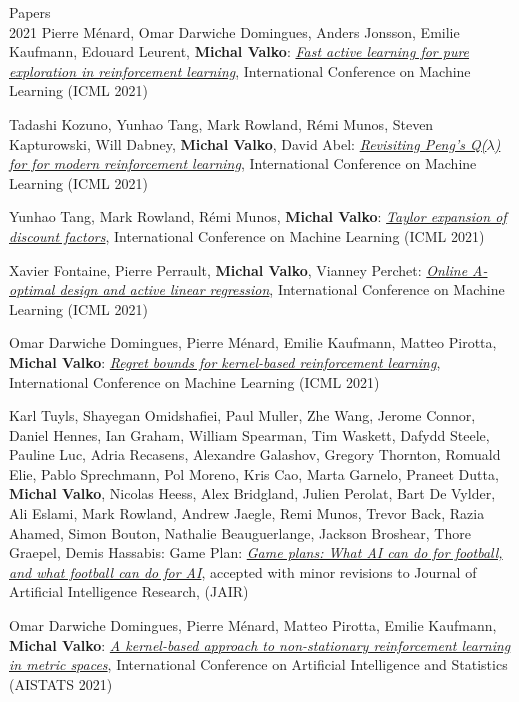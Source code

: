 \documentclass{resume}
\begin{document}
\begin{category}{Papers\\2021}
\citembullet
Pierre M\' enard,  Omar Darwiche Domingues, Anders Jonsson,  Emilie Kaufmann, Edouard Leurent, {\bf Michal Valko}:
\href{http://arxiv.org/abs/2007.13442.pdf}{\emph{Fast active learning for pure exploration in reinforcement learning}},
International Conference on Machine Learning
({\sf ICML 2021}) 


\citembullet
Tadashi Kozuno, Yunhao Tang, Mark Rowland, R\' emi Munos, Steven Kapturowski, Will Dabney, {\bf Michal Valko}, David Abel: 
\href{https://arxiv.org/pdf/2103.00107.pdf}{\emph{Revisiting Peng's Q($\lambda$) for for modern reinforcement learning}},
International Conference on Machine Learning
({\sf ICML 2021}) 

\citembullet
Yunhao Tang, Mark Rowland, R\' emi Munos, {\bf Michal Valko}: 
\href{https://arxiv.org/pdf/2106.06170.pdf}{\emph{Taylor expansion of discount factors}},
International Conference on Machine Learning
({\sf ICML 2021}) 

\citembullet
Xavier Fontaine, Pierre Perrault, {\bf Michal Valko}, Vianney Perchet:
\href{https://arxiv.org/pdf/1906.08509.pdf}{\emph{Online A-optimal design and active linear regression}},
International Conference on Machine Learning
({\sf ICML 2021}) 


\citembullet
Omar Darwiche Domingues, Pierre M\'enard, Emilie Kaufmann, Matteo Pirotta, {\bf Michal Valko}:
\href{https://arxiv.org/abs/2004.05599}{\emph{Regret bounds for kernel-based reinforcement learning}},
International Conference on Machine Learning
({\sf ICML 2021}) 


\citembullet
Karl Tuyls, Shayegan Omidshafiei, Paul Muller, Zhe Wang, Jerome Connor, Daniel Hennes, Ian Graham, William Spearman, Tim Waskett, Dafydd Steele, Pauline Luc, Adria Recasens, Alexandre Galashov, Gregory Thornton, Romuald Elie, Pablo Sprechmann, Pol Moreno, Kris Cao, Marta Garnelo, Praneet Dutta, {\bf Michal Valko}, Nicolas Heess, Alex Bridgland, Julien Perolat, Bart De Vylder, Ali Eslami, Mark Rowland, Andrew Jaegle, Remi Munos, Trevor Back, Razia Ahamed, Simon Bouton, Nathalie Beauguerlange, Jackson Broshear, Thore Graepel, Demis Hassabis: Game Plan: 
\href{https://arxiv.org/pdf/2011.09192.pdf}{\emph{Game plans: What AI can do for football, and what football can do for AI}},
accepted with minor revisions to Journal of Artificial Intelligence Research,
({\sf JAIR}) 


\citembullet
Omar Darwiche Domingues, Pierre M\'enard,  Matteo Pirotta, Emilie Kaufmann, {\bf Michal Valko}:
\href{https://arxiv.org/pdf/2007.05078.pdf}
{\emph{A kernel-based approach to non-stationary reinforcement learning in metric spaces}},
International Conference on Artificial Intelligence and Statistics
({\sf AISTATS 2021}) 



\end{category}
\end{document}
